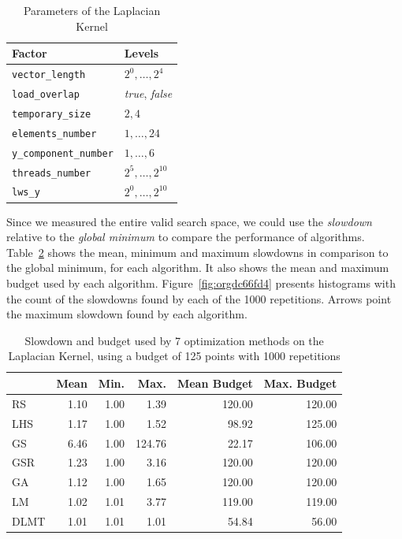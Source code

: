 \documentclass[conference]{IEEEtran}
\begin{document}
\begin{table}[t]
\caption{\label{tab:org9b3ad1c}
Parameters of the Laplacian Kernel}
\centering
\scriptsize
\begin{tabular}{ll}
\toprule
Factor & Levels\\
\midrule
\texttt{vector\_length} & \(2^0,\dots,2^4\)\\
\texttt{load\_overlap} & \textit{true}, \textit{false}\\
\texttt{temporary\_size} & \(2,4\)\\
\texttt{elements\_number} & \(1,\dots,24\)\\
\texttt{y\_component\_number} & \(1,\dots,6\)\\
\texttt{threads\_number} & \(2^5,\dots,2^{10}\)\\
\texttt{lws\_y} & \(2^0,\dots,2^{10}\)\\
\bottomrule
\end{tabular}
\end{table}

Since we measured the entire valid search space, we could use the \emph{slowdown}
relative to the \emph{global minimum} to compare the performance of algorithms.
Table~\ref{tab:gpu_laplacian_compare_budget} shows the mean, minimum and
maximum slowdowns in comparison to the global minimum, for each algorithm. It
also shows the mean and maximum budget used by each algorithm.
Figure~\ref{fig:orgdc66fd4} presents histograms with the
count of the slowdowns found by each of the 1000 repetitions. Arrows point the
maximum slowdown found by each algorithm.

\begin{table}[ht]
\centering
\caption{Slowdown and budget used by 7 optimization methods on the Laplacian Kernel, using a budget of 125 points with 1000 repetitions}
\label{tab:gpu_laplacian_compare_budget}
\begingroup\footnotesize
\begin{tabular}{lrrrrr}
  \toprule
 & Mean & Min. & Max. & Mean Budget & Max. Budget \\
  \midrule
RS & 1.10 & 1.00 & 1.39 & 120.00 & 120.00 \\
  LHS & 1.17 & 1.00 & 1.52 & 98.92 & 125.00 \\
  GS & 6.46 & 1.00 & 124.76 & 22.17 & 106.00 \\
  GSR & 1.23 & 1.00 & 3.16 & 120.00 & 120.00 \\
  GA & 1.12 & 1.00 & 1.65 & 120.00 & 120.00 \\
  LM & 1.02 & 1.01 & 3.77 & 119.00 & 119.00 \\
   \rowcolor{red!25}DLMT & 1.01 & 1.01 & 1.01 & 54.84 & 56.00 \\
   \bottomrule
\end{tabular}
\endgroup
\end{table}
\end{document}
